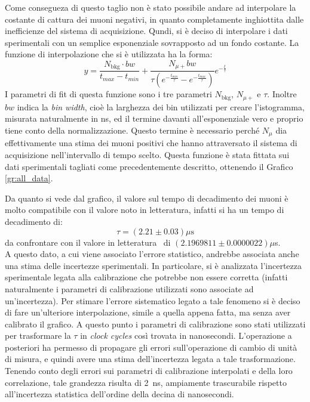 Come consegueza di questo taglio non è stato possibile andare ad interpolare la costante di cattura dei muoni negativi, in quanto completamente inghiottita dalle inefficienze del sistema di acquisizione. Qundi, si è deciso di interpolare i dati sperimentali con un semplice esponenziale sovrapposto ad un fondo costante. La funzione di interpolazione che si è utilizzata ha la forma:
\begin{equation}
  y = \frac{N_\text{bkg} \cdot bw}{t_\textit{max}-t_\textit{min}}+\frac{N_{\mu+}bw}{\tau \left(e^{-\frac{t_\textit{min}}{\tau}} - e^{-\frac{t_\textit{max}}{\tau}}\right)}
  e^{-\frac{t}{\tau}} 
  \label{eq:fit_mean_life}
\end{equation}
I parametri di fit di questa funzione sono i tre parametri $N_\text{bkg}$, $N_{\mu+}$ e $\tau$. Inoltre $bw$ indica la \textit{bin width}, cioè la larghezza dei bin utilizzati per creare l'istogramma, misurata naturalmente in ns, ed il termine davanti all'esponenziale vero e proprio tiene conto della normalizzazione. Questo termine è necessario perché $N_\mu$ dia effettivamente una stima dei muoni positivi che hanno attraversato il sistema di acquisizione nell'intervallo di tempo scelto. Questa funzione è stata fittata sui dati sperimentali tagliati come precedentemente descritto, ottenendo il Grafico \ref{gr:all_data}.\\

Da quanto si vede dal grafico, il valore sul tempo di decadimento dei muoni è molto compatibile con il valore noto in  letteratura, infatti si ha un tempo di decadimento di:
\begin{equation}
  \tau = (2.21 \pm 0.03) \mu\text{s}
\end{equation}
da confrontare con il valore in letteratura~\cite{bib:Patrignani:2016xqp} di $(2.1969811 \pm 0.0000022) \mu$s.\\

A questo dato, a cui viene associato l'errore statistico, andrebbe associata anche una stima delle incertezze sperimentali. In particolare, si è analizzata l'incertezza sperimentale legata alla calibrazione che potrebbe non essere corretta (infatti naturalmente i parametri di calibrazione utilizzati sono associate ad un'incertezza). Per  stimare l'errore sistematico legato a tale fenomeno si è deciso di fare un'ulteriore interpolazione, simile a quella appena fatta, ma senza aver calibrato il  grafico. A questo punto i parametri di calibrazione sono stati utilizzati per trasformare la $\tau$ in \textit{clock cycles} così trovata in nanosecondi. L'operazione a posteriori ha permesso di propagare gli errori sull'operazione di cambio di unità di misura, e quindi avere una stima dell'incertezza legata a tale trasformazione. Tenendo conto degli errori sui parametri di calibrazione interpolati e della loro correlazione, tale grandezza risulta di 2~ns, ampiamente trascurabile rispetto all'incertezza statistica dell'ordine della decina di nanosecondi.

